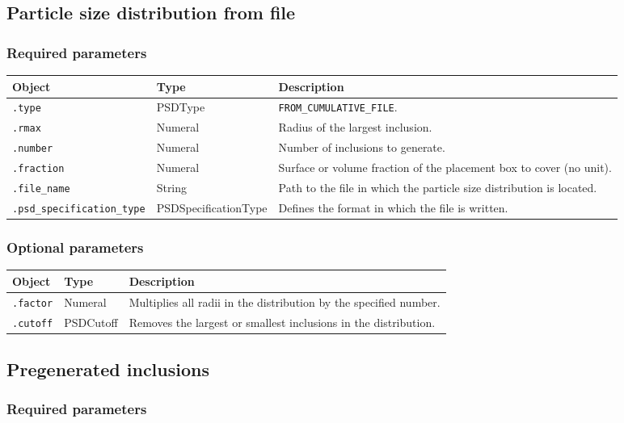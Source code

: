 \documentclass[10pt]{article}
\begin{document}
\subsection{Particle size distribution from file}

\subsubsection*{Required parameters}

\begin{tabularx}{\textwidth}{llX}
\hline 
Object & Type & Description \\ 
\hline 
\verb+.type+ & PSDType & \verb+FROM_CUMULATIVE_FILE+. \\ 
\verb+.rmax+ & Numeral & Radius of the largest inclusion. \\ 
\verb+.number+ & Numeral & Number of inclusions to generate. \\ 
\verb+.fraction+ & Numeral & Surface or volume fraction of the placement box to cover (no unit). \\ 
\verb+.file_name+ & String & Path to the file in which the particle size distribution is located.\\ 
\verb+.psd_specification_type+ & PSDSpecificationType & Defines the format in which the file is written. \\ 
\hline 
\end{tabularx}

\subsubsection*{Optional parameters}

\begin{tabularx}{\textwidth}{llX}
\hline 
Object & Type & Description \\ 
\hline 
\verb+.factor+ & Numeral & Multiplies all radii in the distribution by the specified number. \\ 
\verb+.cutoff+ & PSDCutoff & Removes the largest or smallest inclusions in the distribution. \\ 
\hline 
\end{tabularx}

\subsection{Pregenerated inclusions}

\subsubsection*{Required parameters}
\end{document}
